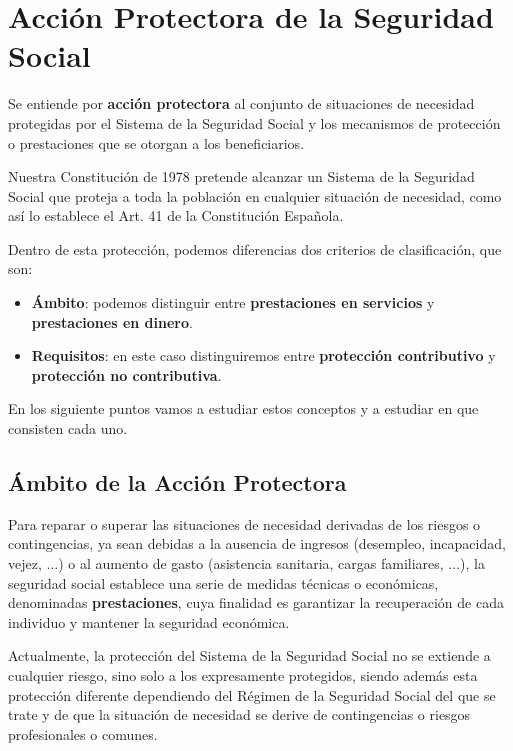 \section{Acción Protectora de la Seguridad Social}
Se entiende por \textbf{acción protectora} al conjunto de situaciones de necesidad protegidas por el Sistema de la Seguridad Social y los mecanismos de protección o prestaciones que se otorgan a los beneficiarios.

Nuestra Constitución de 1978 pretende alcanzar un Sistema de la Seguridad Social que proteja a toda la población en cualquier situación de necesidad, como así lo establece el Art. 41 de la Constitución Española.

Dentro de esta protección, podemos diferencias dos criterios de clasificación, que son:


\begin{itemize}
    \item \textbf{Ámbito}: podemos distinguir entre \textbf{prestaciones en servicios} y \textbf{prestaciones en dinero}.
    \item \textbf{Requisitos}: en este caso distinguiremos entre \textbf{protección contributivo} y \textbf{protección no contributiva}.
\end{itemize}

En los siguiente puntos vamos a estudiar estos conceptos y a estudiar en que consisten cada uno.

\subsection{Ámbito de la Acción Protectora}
Para reparar o superar las situaciones de necesidad derivadas de los riesgos o contingencias, ya sean debidas a la ausencia de ingresos (desempleo, incapacidad, vejez, ...) o al aumento de gasto (asistencia sanitaria, cargas familiares, ...), la seguridad social establece una serie de medidas técnicas o económicas, denominadas \textbf{prestaciones}, cuya finalidad es garantizar la recuperación de cada individuo y mantener la seguridad económica.

Actualmente, la protección del Sistema de la Seguridad Social no se extiende a cualquier riesgo, sino solo a los expresamente protegidos, siendo además esta protección diferente dependiendo del Régimen de la Seguridad Social del que se trate y de que la situación de necesidad se derive de contingencias o riesgos profesionales o comunes.

